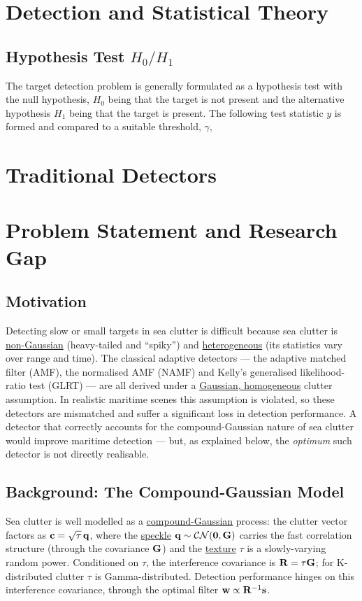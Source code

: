 \documentclass{article}
\begin{document}
\newpage
\section{Detection and Statistical Theory}
\subsection{Hypothesis Test $H_0/H_1$}
The target detection problem is generally formulated as a hypothesis test with the null hypothesis, $H_0$ being that the target is not present and the alternative hypothesis $H_1$ being that the target is present. The following test statistic $y$ is formed and compared to a suitable threshold, $\gamma$,

\newpage
\section{Traditional Detectors}

\newpage
\section{Problem Statement and Research Gap}

\subsection{Motivation}
Detecting slow or small targets in sea clutter is difficult because sea clutter is
\underline{non-Gaussian} (heavy-tailed and ``spiky'') and \underline{heterogeneous}
(its statistics vary over range and time). The classical adaptive detectors --- the
adaptive matched filter (AMF), the normalised AMF (NAMF) and Kelly's generalised
likelihood-ratio test (GLRT) --- are all derived under a \underline{Gaussian,
homogeneous} clutter assumption. In realistic maritime scenes this assumption is
violated, so these detectors are mismatched and suffer a significant loss in
detection performance. A detector that correctly accounts for the compound-Gaussian
nature of sea clutter would improve maritime detection --- but, as explained below,
the \emph{optimum} such detector is not directly realisable.

\subsection{Background: The Compound-Gaussian Model}
Sea clutter is well modelled as a \underline{compound-Gaussian} process: the clutter
vector factors as $\vb c = \sqrt{\tau}\,\vb q$, where the \underline{speckle}
$\vb q\sim\mathcal{CN}(\vb 0,\mathbf{G})$ carries the fast correlation structure (through the
covariance $\mathbf{G}$) and the \underline{texture} $\tau$ is a slowly-varying random power.
Conditioned on $\tau$, the interference covariance is $\mathbf{R} = \tau\mathbf{G}$; for
K-distributed clutter $\tau$ is Gamma-distributed. Detection performance hinges on this
interference covariance, through the optimal filter $\vb w\propto\mathbf{R}^{-1}\vb s$.
\end{document}

